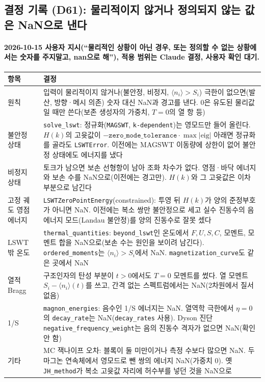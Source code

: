 \subsection{결정 기록 (D61): 물리적이지 않거나 정의되지 않는 값은 NaN으로 낸다}\label{decisions-d61-undefined-nan}
\begingroup%
  \framesubtitle{2026-10-15 사용자 지시(``물리적인 상황이 아닌 경우, 또는 정의할 수 없는 상황에서는 숫자를 주지말고, nan으로 해''), 적용 범위는 Claude 결정, 사용자 확인 대기.}
  \small\renewcommand{\arraystretch}{1.12}
  \begin{tabularx}{\textwidth}{@{}P{3.0cm}Y@{}}
    \toprule
    항목 & 결정 \\
    \midrule
    원칙 & 입력이 물리적이지 않거나(불안정, 비정지, $\langle n_i\rangle>S_i$) 극한이 없으면(발산, 방향·메시 의존) 숫자 대신 NaN과 경고를 낸다. 0은 유도된 물리값일 때만 쓴다(보존 생성자의 가중치, $T=0$의 열 항 등) \\
    불안정 상태 & \texttt{solve\_lswt}: 정규화(\texttt{MAGSWT}, \texttt{k-dependent})는 영모드만 들어 올린다. $H(k)$의 고윳값이 $-\texttt{zero\_mode\_tolerance}\cdot\max|\mathrm{eig}|$ 아래면 정규화를 골라도 \texttt{LSWTError}. 이전에는 MAGSWT 이동량에 상한이 없어 불안정 상태에도 에너지를 냈다 \\
    비정지 상태 & 토크가 남으면 보손 선형항이 남아 조화 차수가 없다. 영점·바닥 에너지와 보손 수를 NaN으로(이전에는 경고만). $H(k)$와 그 고윳값은 이차 부분으로 남긴다 \\
    고정 궤도 영점 에너지 & \texttt{LSWTZeroPointEnergy}(constrained): 투영 뒤 $H(k)$가 양의 준정부호가 아니면 NaN. 이전에는 복소 쌍만 불안정으로 세고 실수 진동수의 음에너지 모드(Landau 불안정)를 양의 진동수로 잘못 셌다 \\
    LSWT 밖 온도 & \texttt{thermal\_quantities}: \texttt{beyond\_lswt}인 온도에서 $F,U,S,C$, 모멘트, 모멘트 합을 NaN으로(보손 수는 원인을 보이려 남긴다). \texttt{ordered\_moments}는 $\langle n_i\rangle>S_i$에서 NaN. \texttt{magnetization\_curve}도 같은 곳에서 NaN \\
    열적 Bragg & 구조인자의 탄성 부분이 $t>0$에서도 $T=0$ 모멘트를 썼다. 열 모멘트 $S_i-\langle n_i\rangle(t)$를 쓰고, 간격 없는 스펙트럼에서는 NaN(2차원에서 질서 없음) \\
    1/S & \texttt{magnon\_energies}: 음수인 1/S 에너지는 NaN. 열역학 극한에서 $\eta=0$의 \texttt{decay\_rate}는 NaN(\texttt{decay\_rates} 사용). Dyson 진단 \texttt{negative\_frequency\_weight}는 음의 진동수 격자가 없으면 NaN(확인 안 함) \\
    기타 & MC 잭나이프 오차: 블록이 둘 미만이거나 측정 수보다 많으면 NaN. 두 마그논 연속체에서 영모드로 뺀 쌍의 에너지 NaN(가중치 0). 옛 \texttt{JH\_method}가 복소 고윳값 자리에 허수부를 넣던 것을 NaN으로 \\

\end{tabularx}
